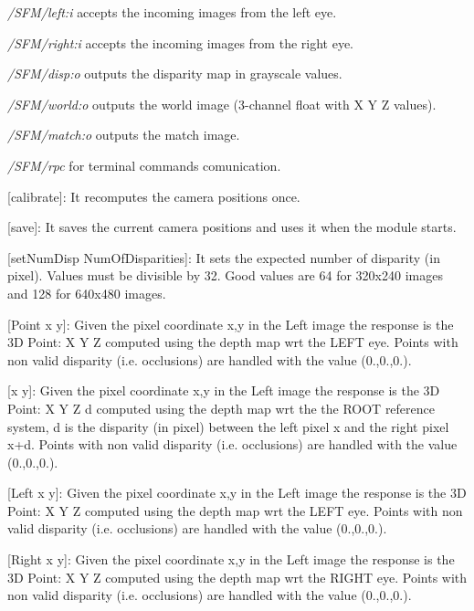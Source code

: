 \begin{DoxyItemize}
\item {\itshape  /\+S\+F\+M/left\+:i } accepts the incoming images from the left eye.
\item {\itshape  /\+S\+F\+M/right\+:i } accepts the incoming images from the right eye.
\item {\itshape  /\+S\+F\+M/disp\+:o } outputs the disparity map in grayscale values.
\item {\itshape  /\+S\+F\+M/world\+:o} outputs the world image (3-\/channel float with X Y Z values).
\item {\itshape  /\+S\+F\+M/match\+:o} outputs the match image.
\item {\itshape  /\+S\+F\+M/rpc } for terminal commands comunication.
\begin{DoxyItemize}
\item \mbox{[}calibrate\mbox{]}\+: It recomputes the camera positions once.
\item \mbox{[}save\mbox{]}\+: It saves the current camera positions and uses it when the module starts.
\item \mbox{[}set\+Num\+Disp Num\+Of\+Disparities\mbox{]}\+: It sets the expected number of disparity (in pixel). Values must be divisible by 32. Good values are 64 for 320x240 images and 128 for 640x480 images.
\item \mbox{[}Point x y\mbox{]}\+: Given the pixel coordinate x,y in the Left image the response is the 3\+D Point\+: X Y Z computed using the depth map wrt the L\+E\+F\+T eye. Points with non valid disparity (i.\+e. occlusions) are handled with the value (0.,0.,0.).
\item \mbox{[}x y\mbox{]}\+: Given the pixel coordinate x,y in the Left image the response is the 3\+D Point\+: X Y Z d computed using the depth map wrt the the R\+O\+O\+T reference system, d is the disparity (in pixel) between the left pixel x and the right pixel x+d. Points with non valid disparity (i.\+e. occlusions) are handled with the value (0.,0.,0.).
\item \mbox{[}Left x y\mbox{]}\+: Given the pixel coordinate x,y in the Left image the response is the 3\+D Point\+: X Y Z computed using the depth map wrt the L\+E\+F\+T eye. Points with non valid disparity (i.\+e. occlusions) are handled with the value (0.,0.,0.).
\item \mbox{[}Right x y\mbox{]}\+: Given the pixel coordinate x,y in the Left image the response is the 3\+D Point\+: X Y Z computed using the depth map wrt the R\+I\+G\+H\+T eye. Points with non valid disparity (i.\+e. occlusions) are handled with the value (0.,0.,0.).

\end{DoxyItemize}
\end{DoxyItemize}
